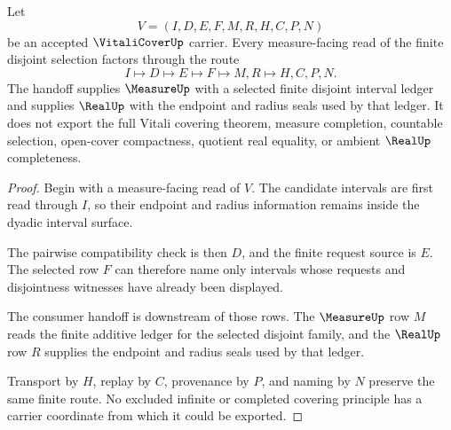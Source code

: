 \begin{theorem}
\label{thm:vitali-cover-finite-selection-handoff}
Let
$$
V=(I,D,E,F,M,R,H,C,P,N)
$$
be an accepted $\VitaliCoverUp$ carrier. Every measure-facing read of the finite disjoint selection factors through the route
$$
I\longmapsto D\longmapsto E\longmapsto F\longmapsto M,R\longmapsto H,C,P,N .
$$
The handoff supplies $\MeasureUp$ with a selected finite disjoint interval ledger and supplies $\RealUp$ with the endpoint and radius seals used by that ledger. It does not export the full Vitali covering theorem, measure completion, countable selection, open-cover compactness, quotient real equality, or ambient $\RealUp$ completeness.
\end{theorem}
\begin{proof}
Begin with a measure-facing read of $V$. The candidate intervals are first read through $I$, so their endpoint and radius information remains inside the dyadic interval surface.

The pairwise compatibility check is then $D$, and the finite request source is $E$. The selected row $F$ can therefore name only intervals whose requests and disjointness witnesses have already been displayed.

The consumer handoff is downstream of those rows. The $\MeasureUp$ row $M$ reads the finite additive ledger for the selected disjoint family, and the $\RealUp$ row $R$ supplies the endpoint and radius seals used by that ledger.

Transport by $H$, replay by $C$, provenance by $P$, and naming by $N$ preserve the same finite route. No excluded infinite or completed covering principle has a carrier coordinate from which it could be exported.
\end{proof}

